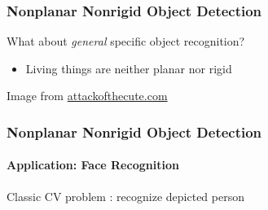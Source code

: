 \documentclass[xetex,professionalfont]{beamer}
\begin{document}

\begin{frame}
\frametitle{Nonplanar Nonrigid Object Detection}

What about \textit{general} specific object recognition?
\begin{itemize}
    \item Living things are neither planar nor rigid
\end{itemize}

\medskip
\begin{center}
    {\centering Image from \url{attackofthecute.com}}
\end{center}

\end{frame}


\begin{frame}
\frametitle{Nonplanar Nonrigid Object Detection}
\framesubtitle{Application: Face Recognition}

Classic CV problem : recognize depicted person

\medskip
\begin{center}
\end{center}

\end{frame}
\end{document}
